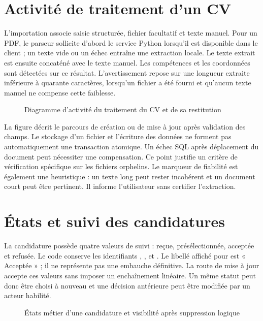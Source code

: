 \section{Activité de traitement d'un CV}
L'importation associe saisie structurée, fichier facultatif et texte manuel. Pour un PDF, le parseur sollicite d'abord le service Python lorsqu'il est disponible dans le client ; un texte vide ou un échec entraîne une extraction locale. Le texte extrait est ensuite concaténé avec le texte manuel. Les compétences et les coordonnées sont détectées sur ce résultat. L'avertissement repose sur une longueur extraite inférieure à quarante caractères, lorsqu'un fichier a été fourni et qu'aucun texte manuel ne compense cette faiblesse.

\begin{figure}[H]\centering
\resizebox{.88\textwidth}{!}{}
\caption{Diagramme d'activité du traitement du CV et de sa restitution}
\label{fig:uml-activite-cv}\end{figure}

La figure décrit le parcours de création ou de mise à jour après validation des champs. Le stockage d'un fichier et l'écriture des données ne forment pas automatiquement une transaction atomique. Un échec SQL après déplacement du document peut nécessiter une compensation. Ce point justifie un critère de vérification spécifique sur les fichiers orphelins. Le marqueur de fiabilité est également une heuristique : un texte long peut rester incohérent et un document court peut être pertinent. Il informe l'utilisateur sans certifier l'extraction.

\section{États et suivi des candidatures}
La candidature possède quatre valeurs de suivi : reçue, présélectionnée, acceptée et refusée. Le code conserve les identifiants , ,  et . Le libellé affiché pour  est « Acceptée » ; il ne représente pas une embauche définitive. La route de mise à jour accepte ces valeurs sans imposer un enchaînement linéaire. Un même statut peut donc être choisi à nouveau et une décision antérieure peut être modifiée par un acteur habilité.

\begin{figure}[H]\centering
\resizebox{.9\textwidth}{!}{}
\caption{États métier d'une candidature et visibilité après suppression logique}
\label{fig:uml-etats}\end{figure}

